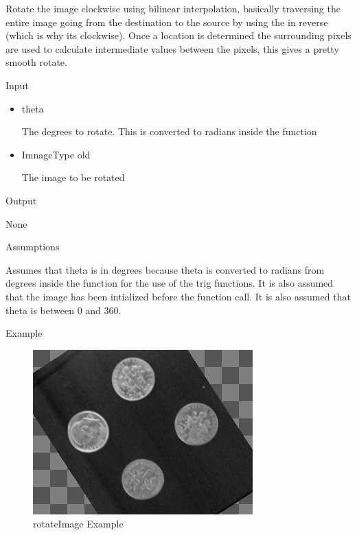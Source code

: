 \documentclass[pdftex, 11pt]{article}
\begin{document}
\begin{description}
\begin{description}
				Rotate the image clockwise using bilinear
				interpolation, basically traversing
				the entire image going from the destination 
				to the source by using the
				in reverse (which is why its clockwise). 
				Once a location is determined the
				surrounding pixels are used to calculate 
				intermediate values between the
				pixels, this gives a pretty smooth rotate.

			\item{Input}

				\begin{itemize}

					\item{theta}

						The degrees to rotate. This is converted
						to radians inside the function

					\item{ImnageType old}

						The image to be rotated

				\end{itemize}

			\item{Output}

				None

			\item{Assumptions}

				Assumes that theta is in degrees because theta is
				converted to radians from degrees inside the function
				for the use of the trig functions.
				It is also assumed that the image has been intialized
				before the function call. It is also assumed that theta
				is between 0 and 360.

			\item{Example}

				\begin{figure}[h]
					\centering
					\caption{rotateImage Example}
				\includegraphics{images/outrotate.png}
			\end{figure}


\end{description}
\end{description}
\end{document}
